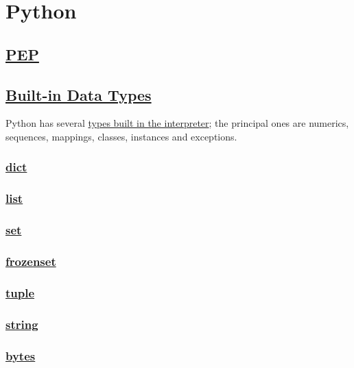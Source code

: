 \chapter{Python}
\label{chap:python}
\section{\href{https://peps.python.org/pep-0008/}{PEP}}

\section{\href{https://docs.python.org/3/library/stdtypes.html\#built-in-types}{Built-in Data Types}}

Python has several \href{https://docs.python.org/3/library/stdtypes.html\#built-in-types}{types built in the interpreter}; 
the principal ones are numerics, sequences, mappings, classes, instances and exceptions.



\subsection{\href{https://docs.python.org/3/library/stdtypes.html\#dict}{dict}}
\subsection{\href{https://docs.python.org/3/library/stdtypes.html\#list}{list}}
\subsection{\href{https://docs.python.org/3/library/stdtypes.html\#set}{set}}
\subsection{\href{https://docs.python.org/3/library/stdtypes.html\#frozenset}{frozenset}}
\subsection{\href{https://docs.python.org/3/library/stdtypes.html\#tuple}{tuple}}
\subsection{\href{https://docs.python.org/3/library/stdtypes.html\#string}{string}}
\subsection{\href{https://docs.python.org/3/library/stdtypes.html\#bytes}{bytes}}
